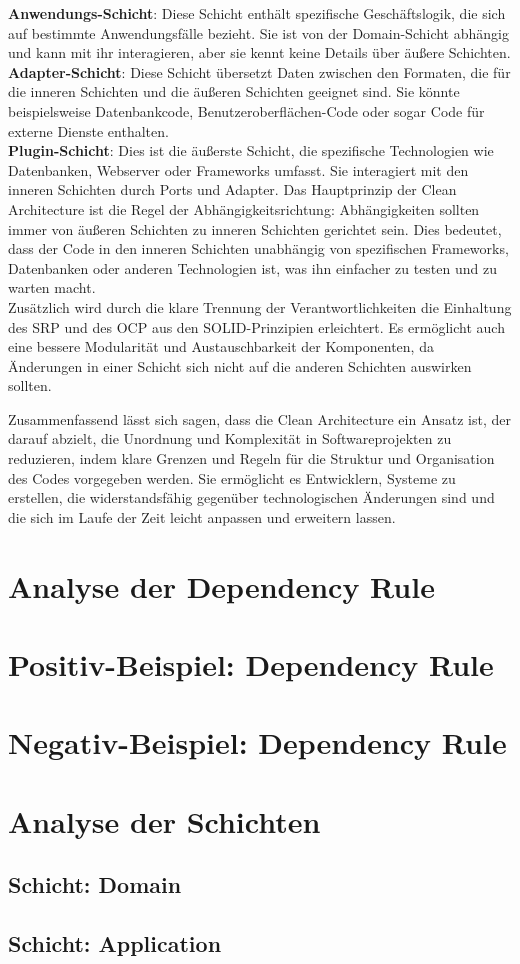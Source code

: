 \textbf{Anwendungs-Schicht}: Diese Schicht enthält spezifische Geschäftslogik, die sich auf bestimmte Anwendungsfälle bezieht. Sie ist von der Domain-Schicht abhängig und kann mit ihr interagieren, aber sie kennt keine Details über äußere Schichten.\\

\textbf{Adapter-Schicht}: Diese Schicht übersetzt Daten zwischen den Formaten, die für die inneren Schichten und die äußeren Schichten geeignet sind. Sie könnte beispielsweise Datenbankcode, Benutzeroberflächen-Code oder sogar Code für externe Dienste enthalten.\\

\textbf{Plugin-Schicht}: Dies ist die äußerste Schicht, die spezifische Technologien wie Datenbanken, Webserver oder Frameworks umfasst. Sie interagiert mit den inneren Schichten durch Ports und Adapter.
\newpage
Das Hauptprinzip der Clean Architecture ist die Regel der Abhängigkeitsrichtung: Abhängigkeiten sollten immer von äußeren Schichten zu inneren Schichten gerichtet sein. Dies bedeutet, dass der Code in den inneren Schichten unabhängig von spezifischen Frameworks, Datenbanken oder anderen Technologien ist, was ihn einfacher zu testen und zu warten macht.\\

Zusätzlich wird durch die klare Trennung der Verantwortlichkeiten die Einhaltung des \acf{SRP} und des \acf{OCP} aus den SOLID-Prinzipien erleichtert. Es ermöglicht auch eine bessere Modularität und Austauschbarkeit der Komponenten, da Änderungen in einer Schicht sich nicht auf die anderen Schichten auswirken sollten.

Zusammenfassend lässt sich sagen, dass die Clean Architecture ein Ansatz ist, der darauf abzielt, die Unordnung und Komplexität in Softwareprojekten zu reduzieren, indem klare Grenzen und Regeln für die Struktur und Organisation des Codes vorgegeben werden. Sie ermöglicht es Entwicklern, Systeme zu erstellen, die widerstandsfähig gegenüber technologischen Änderungen sind und die sich im Laufe der Zeit leicht anpassen und erweitern lassen.
\section{Analyse der Dependency Rule}
\section{Positiv-Beispiel: Dependency Rule}
\section{Negativ-Beispiel: Dependency Rule}
\section{Analyse der Schichten}
\subsection{Schicht: Domain}
\subsection{Schicht: Application}